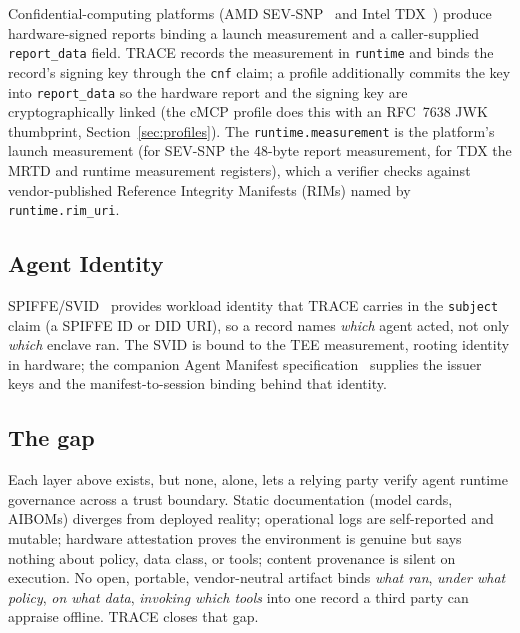 Confidential-computing platforms (AMD SEV-SNP~\citep{amdsevsnp2023} and Intel
TDX~\citep{inteltdx2023}) produce hardware-signed reports binding a launch
measurement and a caller-supplied \texttt{report\_data} field. TRACE records the
measurement in \texttt{runtime} and binds the record's signing key through the
\texttt{cnf} claim; a profile additionally commits the key into \texttt{report\_data}
so the hardware report and the signing key are cryptographically linked (the cMCP
profile does this with an RFC~7638 JWK thumbprint, Section~\ref{sec:profiles}). The
\texttt{runtime.measurement} is the platform's launch measurement (for SEV-SNP
the 48-byte report measurement, for TDX the MRTD and runtime measurement registers),
which a verifier checks against vendor-published Reference Integrity Manifests
(RIMs) named by \texttt{runtime.rim\_uri}.

\subsection{Agent Identity}

SPIFFE/SVID~\citep{spiffe2018} provides workload identity that TRACE carries in the
\texttt{subject} claim (a SPIFFE ID or DID URI), so a record names \emph{which}
agent acted, not only \emph{which} enclave ran. The SVID is bound to the TEE
measurement, rooting identity in hardware; the companion Agent Manifest
specification~\citep{manifest2026} supplies the issuer keys and the
manifest-to-session binding behind that identity.

\subsection{The gap}

Each layer above exists, but none, alone, lets a relying party verify agent runtime
governance across a trust boundary. Static documentation (model cards, AIBOMs)
diverges from deployed reality; operational logs are self-reported and mutable;
hardware attestation proves the environment is genuine but says nothing about policy,
data class, or tools; content provenance is silent on execution. No open, portable,
vendor-neutral artifact binds \emph{what ran}, \emph{under what policy}, \emph{on
what data}, \emph{invoking which tools} into one record a third party can appraise
offline. TRACE closes that gap.
